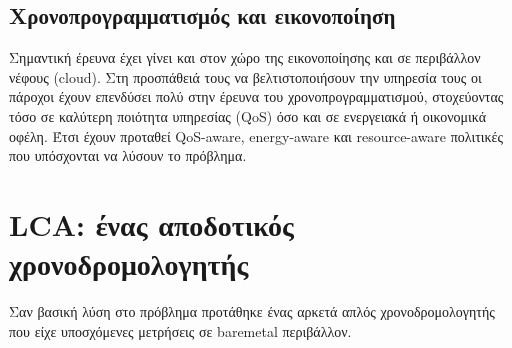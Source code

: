 \subsection{Χρονοπρογραμματισμός και εικονοποίηση}
Σημαντική έρευνα έχει γίνει και στον χώρο της εικονοποίησης και σε περιβάλλον
νέφους (cloud). Στη προσπάθειά τους να βελτιστοποιήσουν την υπηρεσία τους οι
πάροχοι έχουν επενδύσει πολύ στην έρευνα του χρονοπρογραμματισμού, στοχεύοντας
τόσο σε καλύτερη ποιότητα υπηρεσίας (QoS) όσο και σε ενεργειακά ή οικονομικά
οφέλη. Έτσι έχουν προταθεί QoS-aware, energy-aware και resource-aware πολιτικές
που υπόσχονται να λύσουν το πρόβλημα.




\section{LCA: ένας αποδοτικός χρονοδρομολογητής}
Σαν βασική λύση στο πρόβλημα προτάθηκε ένας αρκετά απλός χρονοδρομολογητής που
είχε υποσχόμενες μετρήσεις σε baremetal περιβάλλον.

